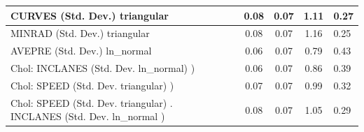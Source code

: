 \begin{table}
\begin{center}
\begin{tabular}{|l|l|c|c|c|l|}
			\hline
			CURVES (Std. Dev.) triangular &  & 0.08 & 0.07 & 1.11 & 0.27 \\
			\hline
			MINRAD (Std. Dev.) triangular &  & 0.08 & 0.07 & 1.16 & 0.25 \\
			\hline
			AVEPRE (Std. Dev.) ln_normal &  & 0.06 & 0.07 & 0.79 & 0.43 \\
			\hline
			 Chol: INCLANES (Std. Dev. ln_normal) ) &  & 0.06 & 0.07 & 0.86 & 0.39 \\
			\hline
			 Chol: SPEED (Std. Dev. triangular) ) &  & 0.07 & 0.07 & 0.99 & 0.32 \\
			\hline
			 Chol: SPEED (Std. Dev. triangular) . INCLANES (Std. Dev.   ln_normal ) &  & 0.08 & 0.07 & 1.05 & 0.29 \\
			\hline
		\end{tabular}
	\end{center}
\end{table}